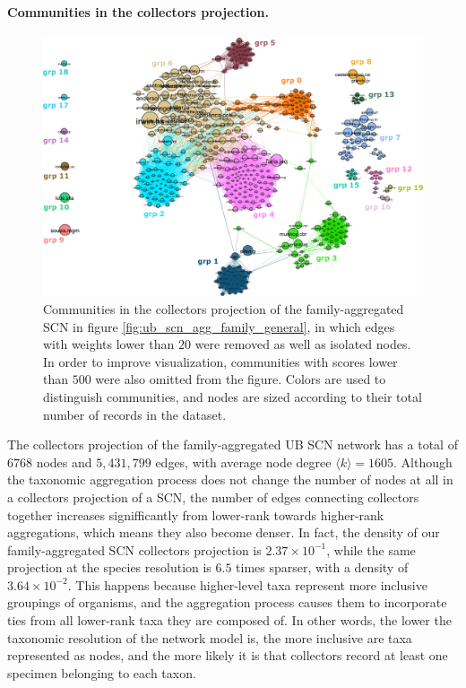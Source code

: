 \paragraph{Communities in the collectors projection.}
\begin{figure}[!ht]
  	\centering
    \includegraphics[width=\linewidth]{figures/casestudy_ub/scn_family_projCol_communities.pdf}
    \caption[Communities in the collectors projection of the family-aggregated SCN.]{ Communities in the collectors projection of the family-aggregated SCN in figure \ref{fig:ub_scn_agg_family_general}, in which edges with weights lower than $20$ were removed as well as isolated nodes. In order to improve visualization, communities with scores lower than $500$ were also omitted from the figure. Colors are used to distinguish communities, and nodes are sized according to their total number of records in the dataset.}
    \label{fig:ub_scn_family_projCol_communities}
\end{figure}
The collectors projection of the family-aggregated UB SCN network has a total of $6768$ nodes and $5,431,799$ edges, with average node degree $\langle k \rangle = 1605$.
Although the taxonomic aggregation process does not change the number of nodes at all in a collectors projection of a SCN, the number of edges connecting collectors together increases signifficantly from lower-rank towards higher-rank aggregations, which means they also become denser.
In fact, the density of our family-aggregated SCN collectors projection is $2.37 \times 10^{-1}$, while the same projection at the species resolution is $6.5$ times sparser, with a density of $3.64 \times 10^{-2}$. 
This happens because higher-level taxa represent more inclusive groupings of organisms, and the aggregation process causes them to incorporate ties from all lower-rank taxa they are composed of.
In other words, the lower the taxonomic resolution of the network model is, the more inclusive are taxa represented as nodes, and the more likely it is that collectors record at least one specimen belonging to each taxon. 

